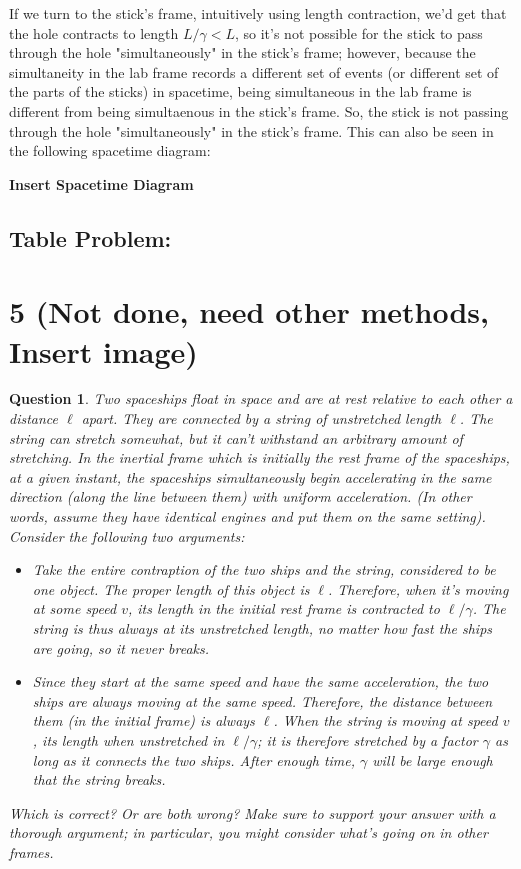 \documentclass{article}
\newtheorem{question}{Question}
\begin{document}
\hfil

If we turn to the stick's frame, intuitively using length contraction, we'd get that the hole contracts to length $L/\gamma<L$, so it's not possible for the stick to pass through the hole "simultaneously" in the stick's frame; however, because the simultaneity in the lab frame records a different set of events (or different set of the parts of the sticks) in spacetime, being simultaneous in the lab frame is different from being simultaenous in the stick's frame. So, the stick is not passing through the hole "simultaneously" in the stick's frame. This can also be seen in the following spacetime diagram:

\textbf{Insert Spacetime Diagram}

\subsection*{Table Problem:}


\break

\section*{5 (Not done, need other methods, Insert image)}
\begin{question}\label{q5}
    Two spaceships float in space and are at rest relative to each other a distance $\ell$ apart. They are connected by a string of unstretched length $\ell$. The string can stretch somewhat, but it can't withstand an arbitrary amount of stretching. In the inertial frame which is initially the rest frame of the spaceships, at a given instant, the spaceships simultaneously begin accelerating in the same direction (along the line between them) with uniform acceleration. (In other words, assume they have identical engines and put them on the same setting). Consider the following two arguments:
    \begin{itemize}
        \item Take the entire contraption of the two ships and the string, considered to be one object. The proper length of this object is $\ell$. Therefore, when it's moving at some speed $v$, its length in the initial rest frame is contracted to $\ell/\gamma$. The string is thus always at its unstretched length, no matter how fast the ships are going, so it never breaks.
        \item Since they start at the same speed and have the same acceleration, the two ships are always moving at the same speed. Therefore, the distance between them (in the initial frame) is always $\ell$. When the string is moving at speed $v$, its length when unstretched in $\ell/\gamma$; it is therefore stretched by a factor $\gamma$ as long as it connects the two ships. After enough time, $\gamma$ will be large enough that the string breaks.
    \end{itemize}
    Which is correct? Or are both wrong? Make sure to support your answer with a thorough argument; in particular, you might consider what's going on in \emph{other} frames.
\end{question}
\end{document}
